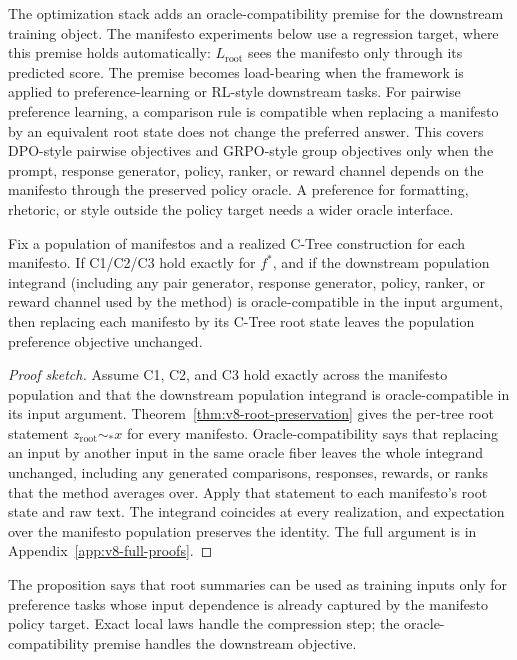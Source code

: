 The optimization stack adds an oracle-compatibility premise for the
downstream training object. The manifesto experiments below use a
regression target, where this premise holds automatically:
\(L_{\mathrm{root}}\) sees the manifesto only through its predicted
score. The premise becomes load-bearing when the framework is applied
to preference-learning or RL-style downstream tasks. For pairwise
preference learning, a comparison rule is compatible when replacing a
manifesto by an equivalent root state does not change the preferred
answer. This covers DPO-style pairwise objectives
\citep{BradleyTerry1952,RafailovEtAl2023DPO} and GRPO-style group
objectives only when the prompt, response generator, policy, ranker,
or reward channel depends on the manifesto through the preserved
policy oracle. A preference for formatting, rhetoric, or style
outside the policy target needs a wider oracle interface.

\begin{proposition}
\label{prop:v8-manifesto-preference-equivalence}
Fix a population of manifestos and a realized C-Tree construction for each
manifesto. If C1/C2/C3 hold exactly for \(f^\ast\), and if the downstream
population integrand (including any pair generator, response generator,
policy, ranker, or reward channel used by the method) is oracle-compatible in
the input argument, then replacing each manifesto by its C-Tree root state
leaves the population preference objective unchanged.
\end{proposition}

\begin{proof}[Proof sketch]
Assume C1, C2, and C3 hold exactly across the manifesto population
and that the downstream population integrand is oracle-compatible in
its input argument. Theorem~\ref{thm:v8-root-preservation} gives the
per-tree root statement \(z_{\mathrm{root}}\sim_\ast x\) for every
manifesto. Oracle-compatibility says that replacing an input by
another input in the same oracle fiber leaves the whole integrand
unchanged, including any generated comparisons, responses, rewards,
or ranks that the method averages over. Apply that statement to each
manifesto's root state and raw text. The integrand coincides at every
realization, and expectation over the manifesto population preserves
the identity. The full argument is in
Appendix~\ref{app:v8-full-proofs}.
\end{proof}

The proposition says that root summaries can be used as training inputs only
for preference tasks whose input dependence is already captured by the
manifesto policy target. Exact local laws handle the compression step; the
oracle-compatibility premise handles the downstream objective.

